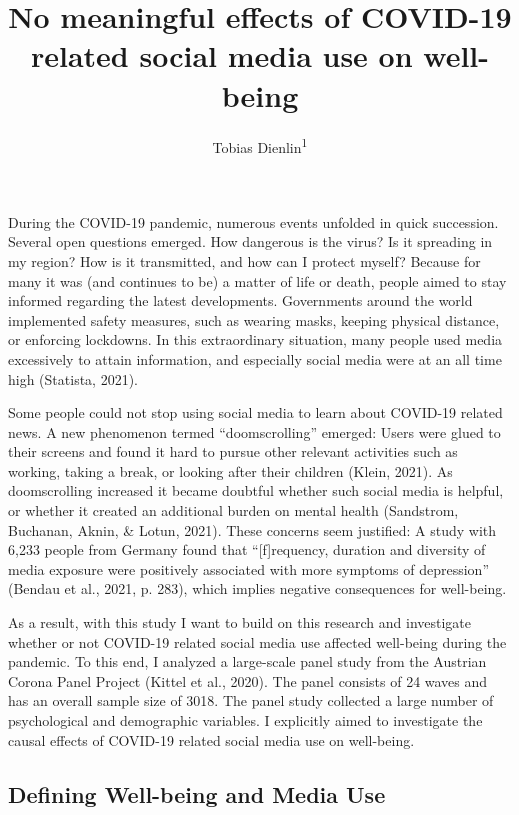 \documentclass[
  english,
  man,mask,floatsintext]{apa6}
\title{No meaningful effects of COVID-19 related social media use on well-being}
\author{Tobias Dienlin\textsuperscript{1}}
\date{}
\affiliation{\vspace{0.5cm}\textsuperscript{1} University of Vienna}
\begin{document}
\maketitle

During the COVID-19 pandemic,
numerous events unfolded in quick succession.
Several open questions emerged.
How dangerous is the virus?
Is it spreading in my region?
How is it transmitted, and how can I protect myself?
Because for many it was (and continues to be) a matter of life or death, people aimed to stay informed regarding the latest developments.
Governments around the world implemented safety measures, such as wearing masks, keeping physical distance, or enforcing lockdowns.
In this extraordinary situation, many people used media excessively to attain information, and especially social media were at an all time high (Statista, 2021).

Some people could not stop using social media to learn about COVID-19 related news.
A new phenomenon termed ``doomscrolling'' emerged:
Users were glued to their screens and found it hard to pursue other relevant activities such as working, taking a break, or looking after their children (Klein, 2021).
As doomscrolling increased it became doubtful whether such social media is helpful, or whether it created an additional burden on mental health (Sandstrom, Buchanan, Aknin, \& Lotun, 2021).
These concerns seem justified:
A study with 6,233 people from Germany found that ``{[}f{]}requency, duration and diversity of media exposure were positively associated with more symptoms of depression'' (Bendau et al., 2021, p. 283), which implies negative consequences for well-being.

As a result, with this study I want to build on this research and investigate whether or not COVID-19 related social media use affected well-being during the pandemic.
To this end, I analyzed a large-scale panel study from the Austrian Corona Panel Project (Kittel et al., 2020).
The panel consists of 24 waves and has an overall sample size of 3018.
The panel study collected a large number of psychological and demographic variables.
I explicitly aimed to investigate the causal effects of COVID-19 related social media use on well-being.

\hypertarget{defining-well-being-and-media-use}{%
\subsection{Defining Well-being and Media Use}\label{defining-well-being-and-media-use}}
\end{document}
